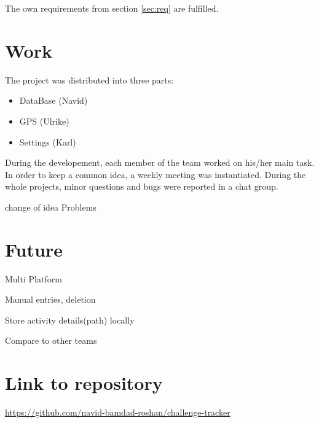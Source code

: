 \documentclass{article}
\begin{document}
	The own requirements from section \ref{sec:req} are fulfilled.
	\section{Work}
	The project was distributed into three parts:
	\begin{itemize}
		\item DataBase (Navid)
		\item GPS (Ulrike)
		\item Settings (Karl)
	\end{itemize}
	During the developement, each member of the team worked on his/her main task. In order to keep a common idea, a weekly meeting was instantiated. During the whole projects, minor questions and bugs were reported in a chat group.
	
	change of idea
	Problems
	\section{Future}
	Multi Platform
	
	Manual entries, deletion
	
	Store activity details(path) locally
	
	Compare to other teams
	
	\section{Link to repository}
	\url{https://github.com/navid-bamdad-roshan/challenge-tracker}
	
	
\end{document}
